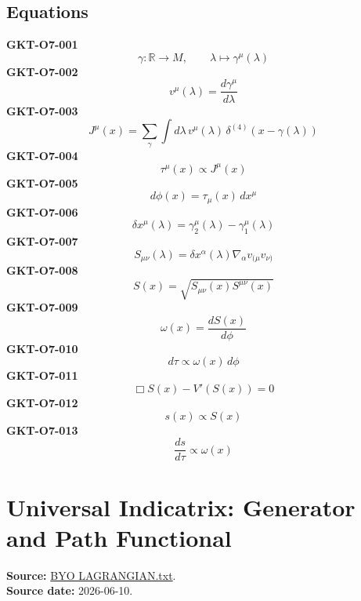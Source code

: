 \documentclass[10pt]{article}
\begin{document}
\subsection*{Equations}
\textbf{GKT-O7-001}
\begin{equation*}
\gamma:\mathbb R\to M,\qquad \lambda\mapsto\gamma^\mu(\lambda)
\end{equation*}
\textbf{GKT-O7-002}
\begin{equation*}
v^\mu(\lambda)=\frac{d\gamma^\mu}{d\lambda}
\end{equation*}
\textbf{GKT-O7-003}
\begin{equation*}
J^\mu(x)=\sum_{\gamma}\int d\lambda\,v^\mu(\lambda)\,\delta^{(4)}\!\left(x-\gamma(\lambda)\right)
\end{equation*}
\textbf{GKT-O7-004}
\begin{equation*}
\tau^\mu(x)\propto J^\mu(x)
\end{equation*}
\textbf{GKT-O7-005}
\begin{equation*}
d\phi(x)=\tau_\mu(x)\,dx^\mu
\end{equation*}
\textbf{GKT-O7-006}
\begin{equation*}
\delta x^\mu(\lambda)=\gamma_2^\mu(\lambda)-\gamma_1^\mu(\lambda)
\end{equation*}
\textbf{GKT-O7-007}
\begin{equation*}
S_{\mu\nu}(\lambda)=\delta x^\alpha(\lambda)\nabla_\alpha v_{(\mu}v_{\nu)}
\end{equation*}
\textbf{GKT-O7-008}
\begin{equation*}
S(x)=\sqrt{S_{\mu\nu}(x)S^{\mu\nu}(x)}
\end{equation*}
\textbf{GKT-O7-009}
\begin{equation*}
\omega(x)=\frac{dS(x)}{d\phi}
\end{equation*}
\textbf{GKT-O7-010}
\begin{equation*}
d\tau\propto\omega(x)\,d\phi
\end{equation*}
\textbf{GKT-O7-011}
\begin{equation*}
\Box S(x)-V'(S(x))=0
\end{equation*}
\textbf{GKT-O7-012}
\begin{equation*}
s(x)\propto S(x)
\end{equation*}
\textbf{GKT-O7-013}
\begin{equation*}
\frac{ds}{d\tau}\propto\omega(x)
\end{equation*}

\section{Universal Indicatrix: Generator and Path Functional}
\textbf{Source:} \href{https://github.com/Satobloc/SAT_THEORY_ARCHIVE_2023-25/blob/main/BYO%20LAGRANGIAN.txt}{BYO LAGRANGIAN.txt}.\\
\textbf{Source date:} 2026-06-10.
\end{document}
